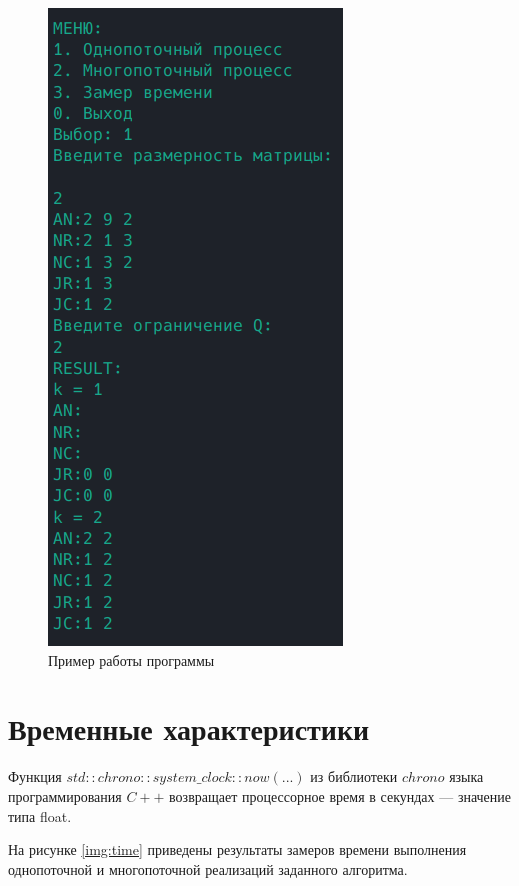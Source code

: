 \begin{figure}[H]
	\begin{center}
		\includegraphics[scale=1]{img/example.png}
	\end{center}
	\captionsetup{justification=centering}
	\caption{Пример работы программы}
	\label{img:example}
\end{figure}

\section{Временные характеристики}

Функция $std::chrono::system\_clock::now(...)$ из библиотеки $chrono$ языка программирования $C++$ возвращает  процессорное время в секундах --- значение типа float.

На рисунке \ref{img:time} приведены результаты замеров времени выполнения однопоточной и многопоточной  реализаций заданного алгоритма.

